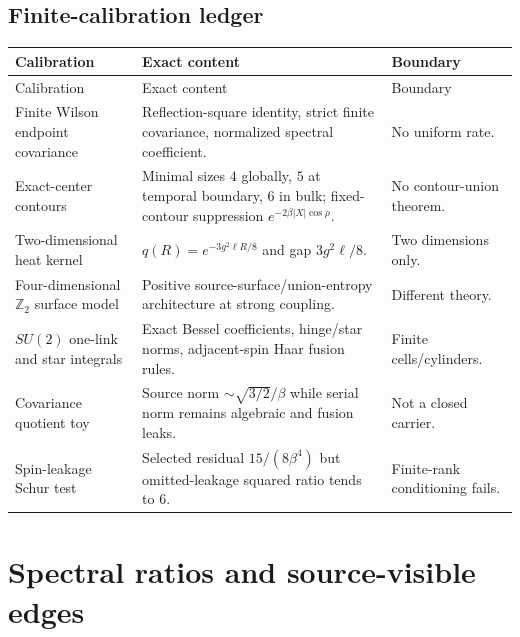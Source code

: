 \documentclass[11pt,oneside]{report}
\theoremstyle{definition}
\theoremstyle{remark}
\begin{document}
\section{Finite-calibration ledger}
\begin{longtable}{p{}p{}p{}}
\toprule Calibration & Exact content & Boundary \\
\midrule\endfirsthead\toprule Calibration & Exact content & Boundary \\
\midrule\endhead
Finite Wilson endpoint covariance & Reflection-square identity, strict finite covariance, normalized spectral coefficient. & No uniform rate. \\
Exact-center contours & Minimal sizes $4$ globally, $5$ at temporal boundary, $6$ in bulk; fixed-contour suppression $e^{-2\beta|X|\cos\rho}$. & No contour-union theorem. \\
Two-dimensional heat kernel & $q(R)=e^{-3g^2\ell R/8}$ and gap $3g^2\ell/8$. & Two dimensions only. \\
Four-dimensional $\mathbb Z_2$ surface model & Positive source-surface/union-entropy architecture at strong coupling. & Different theory. \\
$SU(2)$ one-link and star integrals & Exact Bessel coefficients, hinge/star norms, adjacent-spin Haar fusion rules. & Finite cells/cylinders. \\
Covariance quotient toy & Source norm $\sim\sqrt{3/2}/\beta$ while serial norm remains algebraic and fusion leaks. & Not a closed carrier. \\
Spin-leakage Schur test & Selected residual $15/(8\beta^4)$ but omitted-leakage squared ratio tends to $6$. & Finite-rank conditioning fails. \\
\bottomrule
\end{longtable}

\chapter{Spectral ratios and source-visible edges}
\end{document}
